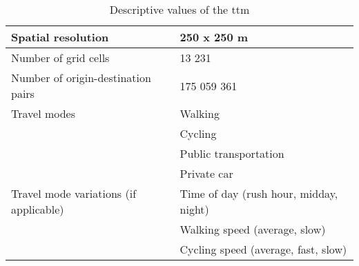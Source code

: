 \begin{table}[H]
	\caption{Descriptive values of the \acrshort{ttm}}
	\label{tab:ttm description}
	\centering
	\begin{tabular}{ | L{0.4\textwidth} | L{0.5\textwidth} | }
		\hline
		Spatial resolution
		& 250 x 250 m
		\\
		\hline
		Number of grid cells
		& 13 231
		\\
		\hline
		Number of origin-destination pairs
		& 175 059 361
		\\
		\hline
		Travel modes
		& \tabitem Walking \\
		& \tabitem Cycling \\
		& \tabitem Public transportation \\
		& \tabitem Private car \\
		\hline
		Travel mode variations (if applicable)
		& \tabitem Time of day (rush hour, midday, night) \\
		& \tabitem Walking speed (average, slow) \\
		& \tabitem Cycling speed (average, fast, slow) \\
		\hline
	\end{tabular}
\end{table}
